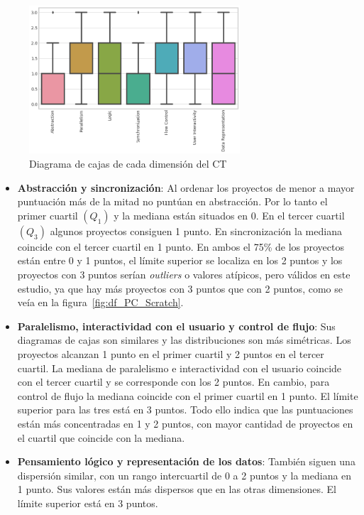 \documentclass[a4paper, 12pt]{book}
\begin{document}
\begin{figure}[H]
    \centering
    \includegraphics[width=0.7\textwidth]{img/diag_cajas_Scratch2.png}
    \caption{Diagrama de cajas de cada dimensión del CT}
    \label{fig:cajas_Scratch}
\end{figure}

\begin{itemize}
    \item \textbf{Abstracción y sincronización}: Al ordenar los proyectos de menor a mayor puntuación más de la mitad no puntúan en abstracción. Por lo tanto el primer cuartil $(Q_1)$ y la mediana están situados en 0. En el tercer cuartil $(Q_3)$ algunos proyectos consiguen 1 punto. En sincronización la mediana coincide con el tercer cuartil en 1 punto. En ambos el 75\% de los proyectos están entre 0 y 1 puntos, el límite superior se localiza en los 2 puntos y los proyectos con 3 puntos serían \emph{outliers} o valores atípicos, pero válidos en este estudio, ya que hay más proyectos con 3 puntos que con 2 puntos, como se veía en la  figura~\ref{fig:df_PC_Scratch}.
    \item \textbf{Paralelismo, interactividad con el usuario y control de flujo}: Sus diagramas de cajas son similares y las distribuciones son más simétricas. Los proyectos alcanzan 1 punto en el primer cuartil y 2 puntos en el tercer cuartil. La mediana de paralelismo e interactividad con el usuario coincide con el tercer cuartil y se corresponde con los 2 puntos. En cambio, para control de flujo la mediana coincide con el primer cuartil en 1 punto. El límite superior para las tres está en 3 puntos. Todo ello indica que las puntuaciones están más concentradas en 1 y 2 puntos, con mayor cantidad de proyectos en el cuartil que coincide con la mediana.
    \item\textbf{Pensamiento lógico y representación de los datos}: También siguen una dispersión similar, con un rango intercuartil de 0 a 2 puntos y la mediana en 1 punto. Sus valores están más dispersos que en las otras dimensiones. El límite superior está en 3 puntos. 
\end{itemize}
\end{document}
